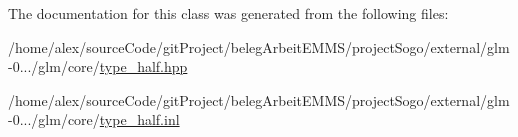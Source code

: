 The documentation for this class was generated from the following files\-:\begin{DoxyCompactItemize}
\item 
/home/alex/source\-Code/git\-Project/beleg\-Arbeit\-E\-M\-M\-S/project\-Sogo/external/glm-\/0.../glm/core/\hyperlink{type__half_8hpp}{type\-\_\-half.\-hpp}\item 
/home/alex/source\-Code/git\-Project/beleg\-Arbeit\-E\-M\-M\-S/project\-Sogo/external/glm-\/0.../glm/core/\hyperlink{type__half_8inl}{type\-\_\-half.\-inl}\end{DoxyCompactItemize}
